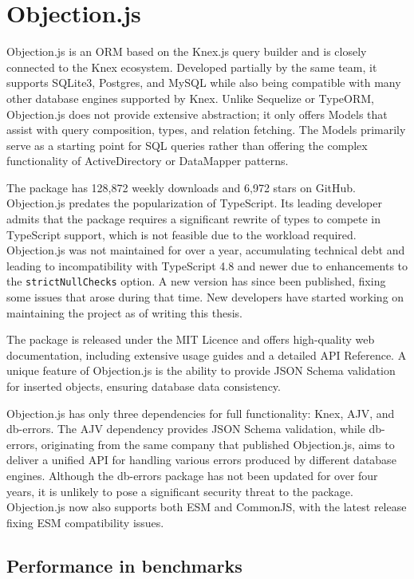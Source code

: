 \section{Objection.js}
Objection.js is an ORM based on the Knex.js query builder and is closely
connected to the Knex ecosystem. Developed partially by the same team, it
supports SQLite3, Postgres, and MySQL while also being compatible with many
other database engines supported by Knex. Unlike Sequelize or TypeORM,
Objection.js does not provide extensive abstraction; it only offers Models that
assist with query composition, types, and relation fetching. The Models
primarily serve as a starting point for SQL queries rather than offering the
complex functionality of ActiveDirectory or DataMapper patterns. 

The package has 128,872 weekly downloads and 6,972 stars on GitHub. Objection.js
predates the popularization of TypeScript. Its leading developer admits that the
package requires a significant rewrite of types to compete in TypeScript
support, which is not feasible due to the workload required. Objection.js was
not maintained for over a year, accumulating technical debt and leading to
incompatibility with TypeScript 4.8 and newer due to enhancements to the
\texttt{strictNullChecks} option. A new version has since been published, fixing
some issues that arose during that time. New developers have started working on
maintaining the project as of writing this thesis.

The package is released under the MIT Licence and offers high-quality web
documentation, including extensive usage guides and a detailed API Reference. A
unique feature of Objection.js is the ability to provide JSON Schema validation
for inserted objects, ensuring database data consistency.

Objection.js has only three dependencies for full functionality: Knex, AJV, and
db-errors. The AJV dependency provides JSON Schema validation, while db-errors,
originating from the same company that published Objection.js, aims to deliver a
unified API for handling various errors produced by different database engines.
Although the db-errors package has not been updated for over four years, it is
unlikely to pose a significant security threat to the package. Objection.js now
also supports both ESM and CommonJS, with the latest release fixing ESM
compatibility issues.

\subsection*{Performance in benchmarks}

